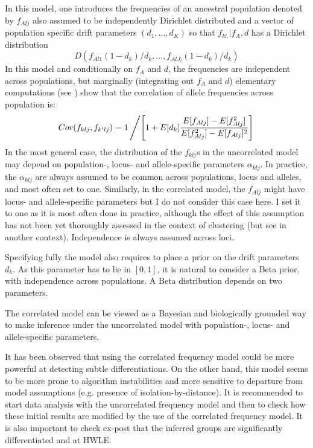 \documentclass{article}
\begin{document}
In this model, one introduces the frequencies of an ancestral population denoted by $f_{Alj}$ also assumed to be 
independently Dirichlet distributed and a vector of population specific drift parameters $(d_1,...,d_K)$ so that 
$f_{kl.}|f_A,d$ has a Dirichlet distribution
\begin{equation}
{ D}\left(f_{Al1}(1-d_k)/d_k,...,f_{AlJ_l} (1-d_k)/d_k\right)
\end{equation}
In this model and conditionally on $f_A$ and $d$, the frequencies are independent 
across populations, but marginally (integrating out $f_A$ and $d$) elementary computations (see \citep{Guillot08b}) 
show that the correlation of allele frequencies across population is:
\begin{equation}
Cor(f_{klj},f_{k'lj}) = 1\left/ \left[1+ E[d_k]\frac{E[f_{Alj}]-E[f_{Alj}^2]}{E[f_{Alj}^2]-E[f_{Alj}]^2}\right] \right.
\end{equation}
In the most general case, the distribution of the $f_{klj}$s in the uncorrelated model may depend on 
population-, locus- and allele-specific parameters 
$\alpha_{klj}$. In practice, the $\alpha_{klj}$ are always assumed to be common across  populations, locus and alleles,  and most often set to one. 
Similarly, in the correlated model, the $f_{Alj}$ might have locus- and allele-specific parameters but I do not consider this case here.
I set it to one as it is  most often done in practice, 
although the effect of this assumption has not been yet thoroughly assessed in the context of clustering 
(but see \citep{Foll08} in another context). 
Independence is always assumed across loci. 

Specifying fully the model also requires to place a prior on the drift parameters $d_k$. As this parameter 
has to lie in $[0,1]$, it is natural to 
consider a Beta prior, with independence across populations. A Beta distribution depends on two parameters. 


The correlated model can be viewed as a Bayesian 
and  biologically grounded way to make inference under the uncorrelated model with population-, locus- and allele-specific parameters. 


It has been observed that using the correlated frequency model could be more powerful at detecting subtle differentiations. 
On the other hand, 
this model seems to be more prone to algorithm instabilities and more sensitive to departure from model assumptions 
(e.g. presence of isolation-by-distance).  
It is recommended to start data analysis with the uncorrelated frequency model and then to check how these initial results 
are modified by the use of the correlated frequency model. It is also important to check ex-post that the inferred groups 
are significantly differentiated and at HWLE.
\end{document}
